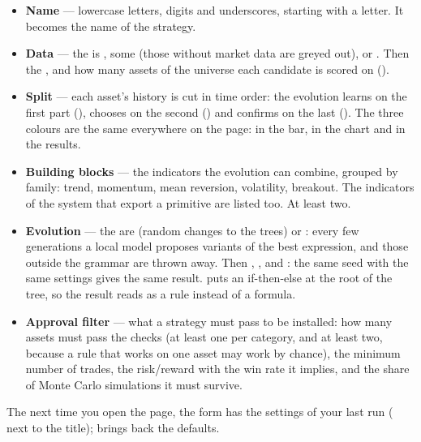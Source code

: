 \begin{itemize}
  \item \textbf{Name} --- lowercase letters, digits and underscores,
        starting with a letter. It becomes the name of the strategy.
  \item \textbf{Data} --- the  is ,
        some  (those without market data are greyed out),
        or . Then the , and how many
        assets of the universe each candidate is scored on
        ().
  \item \textbf{Split} --- each asset's history is cut in time order: the
        evolution learns on the first part (), chooses on the
        second () and confirms on the last ().
        The three colours are the same everywhere on the page: in the bar,
        in the chart and in the results.
  \item \textbf{Building blocks} --- the indicators the evolution can
        combine, grouped by family: trend, momentum, mean reversion,
        volatility, breakout. The indicators of the system that export a
        primitive are listed too. At least two.
  \item \textbf{Evolution} --- the  are 
        (random changes to the trees) or : every few
        generations a local model proposes variants of the best expression,
        and those outside the grammar are thrown away. Then
        , ,  and
        : the same seed with the same settings gives the same
        result.  puts an if-then-else at the root
        of the tree, so the result reads as a rule instead of a formula.
  \item \textbf{Approval filter} --- what a strategy must pass to be
        installed: how many assets must pass the checks (at least one per
        category, and at least two, because a rule that works on one asset
        may work by chance), the minimum number of trades, the
        risk/reward with the win rate it implies, and the share of Monte
        Carlo simulations it must survive.
\end{itemize}

\noindent
The next time you open the page, the form has the settings of your last run
( next to the title); 
brings back the defaults.

